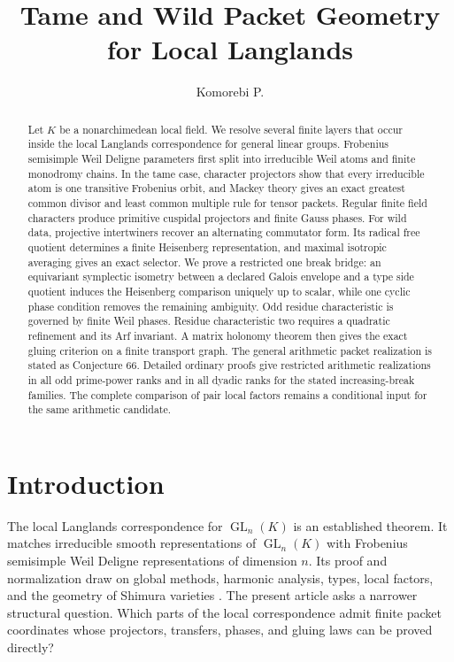 \documentclass[11pt]{amsart}
\title[Tame and wild packet geometry]{Tame and Wild Packet Geometry for Local Langlands}
\author[Komorebi P.]{Komorebi P.}
\date{}
\theoremstyle{definition}
\theoremstyle{remark}
\newcommand{\GL}{\operatorname{GL}}
\begin{document}
\KomorebiCover

\begin{abstract}
Let \(K\) be a nonarchimedean local field. We resolve several finite layers that occur inside the local Langlands correspondence for general linear groups. Frobenius semisimple Weil Deligne parameters first split into irreducible Weil atoms and finite monodromy chains. In the tame case, character projectors show that every irreducible atom is one transitive Frobenius orbit, and Mackey theory gives an exact greatest common divisor and least common multiple rule for tensor packets. Regular finite field characters produce primitive cuspidal projectors and finite Gauss phases. For wild data, projective intertwiners recover an alternating commutator form. Its radical free quotient determines a finite Heisenberg representation, and maximal isotropic averaging gives an exact selector. We prove a restricted one break bridge: an equivariant symplectic isometry between a declared Galois envelope and a type side quotient induces the Heisenberg comparison uniquely up to scalar, while one cyclic phase condition removes the remaining ambiguity. Odd residue characteristic is governed by finite Weil phases. Residue characteristic two requires a quadratic refinement and its Arf invariant. A matrix holonomy theorem then gives the exact gluing criterion on a finite transport graph. The general arithmetic packet realization is stated as Conjecture 66. Detailed ordinary proofs give restricted arithmetic realizations in all odd prime-power ranks and in all dyadic ranks for the stated increasing-break families. The complete comparison of pair local factors remains a conditional input for the same arithmetic candidate.
\end{abstract}
\makeatletter\@setabstract\makeatother
\thispagestyle{plain}
\clearpage
\setcounter{tocdepth}{1}
\begingroup\setlength{\parskip}{0pt}
\tableofcontents
\endgroup
\clearpage

\clearpage

\section{Introduction}\label{sec:introduction}

The local Langlands correspondence for \(\GL_n(K)\) is an established theorem. It matches irreducible smooth representations of \(\GL_n(K)\) with Frobenius semisimple Weil Deligne representations of dimension \(n\). Its proof and normalization draw on global methods, harmonic analysis, types, local factors, and the geometry of Shimura varieties \cite{Henniart2000,HarrisTaylor2001,BushnellHenniart2006}. The present article asks a narrower structural question. Which parts of the local correspondence admit finite packet coordinates whose projectors, transfers, phases, and gluing laws can be proved directly?
\end{document}
